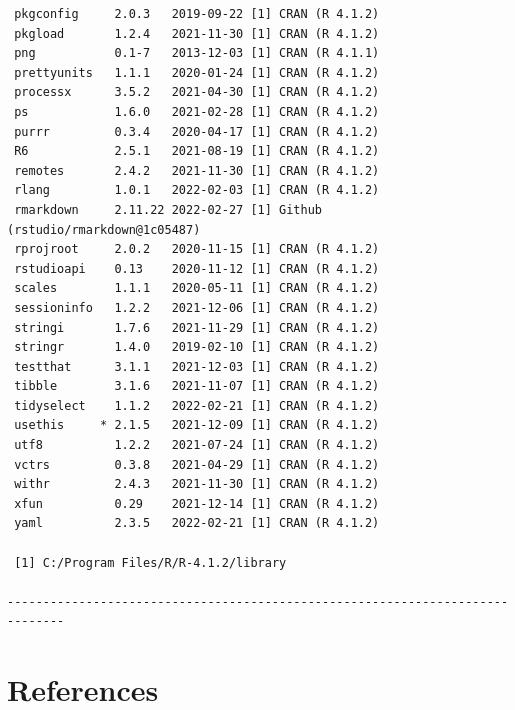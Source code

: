 \documentclass [11pt, proquest] {uwthesis}[2015/03/03]
\begin{document}
\begin{verbatim}
 pkgconfig     2.0.3   2019-09-22 [1] CRAN (R 4.1.2)
 pkgload       1.2.4   2021-11-30 [1] CRAN (R 4.1.2)
 png           0.1-7   2013-12-03 [1] CRAN (R 4.1.1)
 prettyunits   1.1.1   2020-01-24 [1] CRAN (R 4.1.2)
 processx      3.5.2   2021-04-30 [1] CRAN (R 4.1.2)
 ps            1.6.0   2021-02-28 [1] CRAN (R 4.1.2)
 purrr         0.3.4   2020-04-17 [1] CRAN (R 4.1.2)
 R6            2.5.1   2021-08-19 [1] CRAN (R 4.1.2)
 remotes       2.4.2   2021-11-30 [1] CRAN (R 4.1.2)
 rlang         1.0.1   2022-02-03 [1] CRAN (R 4.1.2)
 rmarkdown     2.11.22 2022-02-27 [1] Github (rstudio/rmarkdown@1c05487)
 rprojroot     2.0.2   2020-11-15 [1] CRAN (R 4.1.2)
 rstudioapi    0.13    2020-11-12 [1] CRAN (R 4.1.2)
 scales        1.1.1   2020-05-11 [1] CRAN (R 4.1.2)
 sessioninfo   1.2.2   2021-12-06 [1] CRAN (R 4.1.2)
 stringi       1.7.6   2021-11-29 [1] CRAN (R 4.1.2)
 stringr       1.4.0   2019-02-10 [1] CRAN (R 4.1.2)
 testthat      3.1.1   2021-12-03 [1] CRAN (R 4.1.2)
 tibble        3.1.6   2021-11-07 [1] CRAN (R 4.1.2)
 tidyselect    1.1.2   2022-02-21 [1] CRAN (R 4.1.2)
 usethis     * 2.1.5   2021-12-09 [1] CRAN (R 4.1.2)
 utf8          1.2.2   2021-07-24 [1] CRAN (R 4.1.2)
 vctrs         0.3.8   2021-04-29 [1] CRAN (R 4.1.2)
 withr         2.4.3   2021-11-30 [1] CRAN (R 4.1.2)
 xfun          0.29    2021-12-14 [1] CRAN (R 4.1.2)
 yaml          2.3.5   2022-02-21 [1] CRAN (R 4.1.2)

 [1] C:/Program Files/R/R-4.1.2/library

------------------------------------------------------------------------------
\end{verbatim}
\backmatter

\hypertarget{references}{%
\chapter*{References}\label{references}}


\noindent

\setlength{\parindent}{-0.20in}
\setlength{\leftskip}{0.20in}
\setlength{\parskip}{8pt}
\end{document}
